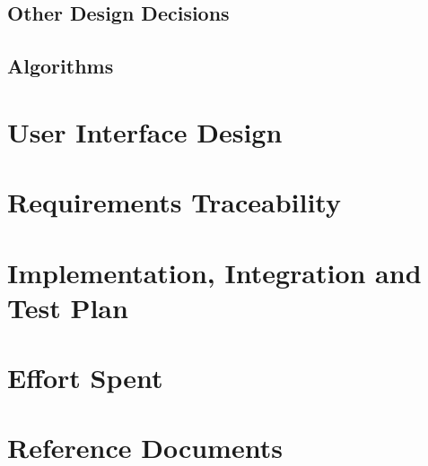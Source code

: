 \documentclass{article}
\begin{document}
\subsection{Other Design Decisions}
\subsection{Algorithms}

\section{User Interface Design}

\section{Requirements Traceability}

\section{Implementation, Integration and Test Plan}

\section{Effort Spent}

\section{Reference Documents}
\end{document}
